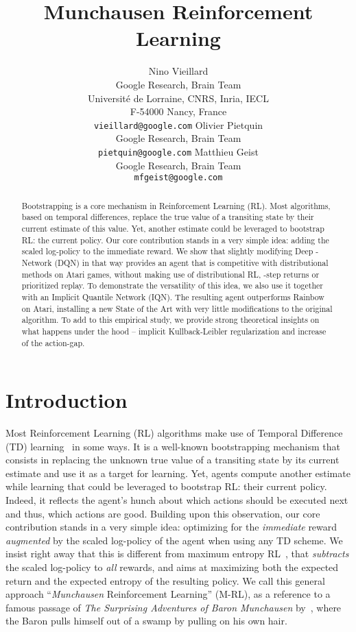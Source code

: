 \documentclass{article}
\title{Munchausen Reinforcement Learning}
\author{
 Nino Vieillard \\
 Google Research, Brain Team \\
 Universit\'e de Lorraine, CNRS, Inria, IECL\\
 F-54000 Nancy, France\\
 \texttt{vieillard@google.com}
 \And
 Olivier Pietquin \\
 Google Research, Brain Team \\
 \texttt{pietquin@google.com}
 \And 
 Matthieu Geist \\
 Google Research, Brain Team \\
 \texttt{mfgeist@google.com}}
\begin{document}
\maketitle


\begin{abstract}
    Bootstrapping is a core mechanism in Reinforcement Learning (RL). Most algorithms, based on temporal differences, replace the true value of a transiting state by their current estimate of this value. Yet, another estimate could be leveraged to bootstrap RL: the current policy. Our core contribution stands in a very simple idea: adding the scaled log-policy to the immediate reward. We show that slightly modifying Deep -Network (DQN) in that way provides an agent that is competitive with distributional methods on Atari games, without making use of distributional RL, -step returns or prioritized replay. To demonstrate the versatility of this idea, we also use it together with an Implicit Quantile Network (IQN). The resulting agent outperforms Rainbow on Atari, installing a new State of the Art with very little modifications to the original algorithm. To add to this empirical study, we provide strong theoretical insights on what happens under the hood -- implicit Kullback-Leibler regularization and increase of the action-gap.
\end{abstract}


\section{Introduction}

 Most Reinforcement Learning (RL) algorithms make use of Temporal Difference (TD) learning~\citep{sutton1988learning} in some ways. It is a well-known bootstrapping mechanism that consists in replacing the unknown true value of a transiting state by its current estimate and use it as a target for learning. Yet, agents compute another estimate while learning that could be leveraged to bootstrap RL: their current policy. Indeed, it reflects the agent's hunch about which actions should be executed next and thus, which actions are good. Building upon this observation, our core contribution stands in a very simple idea: optimizing for the \emph{immediate} reward  \emph{augmented} by the scaled log-policy of the agent when using any TD scheme. We insist right away that this is different from maximum entropy RL~\citep{ziebart2010modeling}, that \emph{subtracts} the scaled log-policy to \emph{all} rewards, and aims at maximizing both the expected return and the expected entropy of the resulting policy. We call this general approach ``\emph{Munchausen} Reinforcement Learning'' (M-RL), as a reference to a famous passage of \textit{The Surprising Adventures of Baron Munchausen} by~\citet{raspe:1785}, where the Baron pulls himself out of a swamp by pulling on his own hair.
\end{document}
